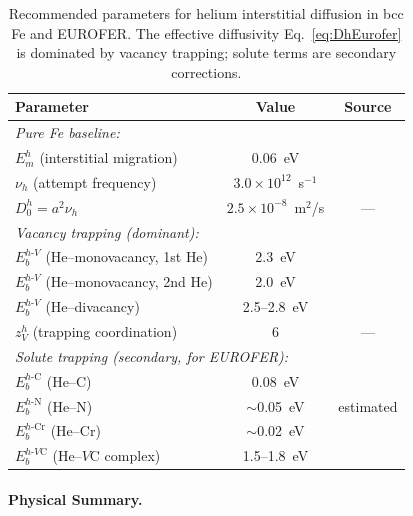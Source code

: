 \documentclass[pdflatex,sn-basic]{sn-jnl} %
\begin{document}
\begin{table}[htbp]
\centering
\caption{Recommended parameters for helium interstitial diffusion in bcc Fe and
EUROFER. The effective diffusivity Eq.~\eqref{eq:DhEurofer} is dominated by
vacancy trapping; solute terms are secondary corrections.}
\label{tab:He_params}
\renewcommand{\arraystretch}{1.3}
\begin{tabular}{@{}lcc@{}}
\toprule
\textbf{Parameter} & \textbf{Value} & \textbf{Source} \\
\midrule
\multicolumn{3}{l}{\emph{Pure Fe baseline:}} \\
$E_m^h$ (interstitial migration) & 0.06~eV & \cite{Fu2005_He} \\
$\nu_h$ (attempt frequency) & $3.0\times10^{12}$~s$^{-1}$ & \cite{Becquart2007} \\
$D_0^h = a^2\nu_h$ & $2.5\times10^{-8}$~m$^2$/s & --- \\[4pt]

\multicolumn{3}{l}{\emph{Vacancy trapping (dominant):}} \\
$E_b^{h\text{-}V}$ (He--monovacancy, 1st He) & 2.3~eV & \cite{Fu2005_He,Seletskaia2005} \\
$E_b^{h\text{-}V}$ (He--monovacancy, 2nd He) & 2.0~eV & \cite{Fu2005_He} \\
$E_b^{h\text{-}V}$ (He--divacancy) & 2.5--2.8~eV & \cite{Borodin2013} \\
$z_V^h$ (trapping coordination) & 6 & --- \\[4pt]

\multicolumn{3}{l}{\emph{Solute trapping (secondary, for EUROFER):}} \\
$E_b^{h\text{-C}}$ (He--C) & 0.08~eV & \cite{Becquart2007} \\
$E_b^{h\text{-N}}$ (He--N) & $\sim$0.05~eV & estimated \\
$E_b^{h\text{-Cr}}$ (He--Cr) & $\sim$0.02~eV & \cite{Seletskaia2005} \\
$E_b^{h\text{-}V\mathrm{C}}$ (He--$V$C complex) & 1.5--1.8~eV & \cite{Becquart2007} \\
\bottomrule
\end{tabular}
\end{table}


\paragraph{Physical Summary.}
\end{document}
